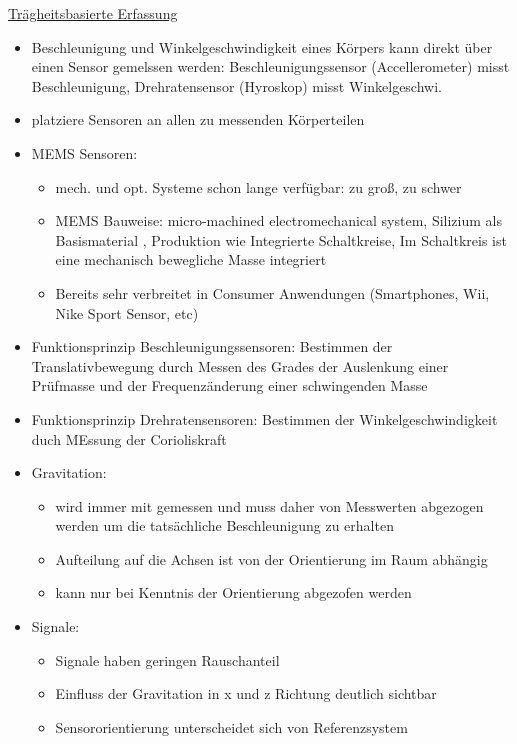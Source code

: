 \documentclass[a4paper,10pt,oneside]{article}
\begin{document}
\underline{Trägheitsbasierte Erfassung} \\
	\begin{itemize}
		\item Beschleunigung und Winkelgeschwindigkeit eines Körpers kann direkt über einen Sensor gemelssen werden: Beschleunigungssensor (Accellerometer) misst Beschleunigung, Drehratensensor (Hyroskop) misst Winkelgeschwi.
		\item platziere Sensoren an allen zu messenden Körperteilen
		\item MEMS Sensoren:
			\begin{itemize}
				\item mech. und opt. Systeme schon lange verfügbar: zu groß, zu schwer
				\item MEMS Bauweise: micro-machined electromechanical system, Silizium als Basismaterial , Produktion wie Integrierte Schaltkreise, Im Schaltkreis ist eine mechanisch bewegliche Masse integriert
				\item Bereits sehr verbreitet in Consumer Anwendungen (Smartphones, Wii, Nike Sport Sensor, etc)
			\end{itemize}
		\item Funktionsprinzip Beschleunigungssensoren: Bestimmen der Translativbewegung durch Messen des Grades der Auslenkung einer Prüfmasse und der Frequenzänderung einer schwingenden Masse
		\item Funktionsprinzip Drehratensensoren: Bestimmen der Winkelgeschwindigkeit duch MEssung der Corioliskraft
		\item Gravitation: 
			\begin{itemize}
				\item wird immer mit gemessen und muss daher von Messwerten abgezogen werden um die tatsächliche Beschleunigung zu erhalten
				\item Aufteilung auf die Achsen ist von der Orientierung im Raum abhängig
				\item kann nur bei Kenntnis der Orientierung abgezofen werden
			\end{itemize}
		\item Signale:
			\begin{itemize}
				\item Signale haben geringen Rauschanteil
				\item Einfluss der Gravitation in x und z Richtung deutlich sichtbar
				\item Sensororientierung unterscheidet sich von Referenzsystem
			\end{itemize}

\end{itemize}
\end{document}
